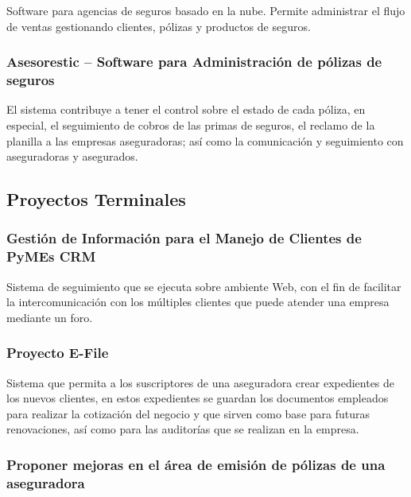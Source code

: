 Software para agencias de seguros basado en la nube. Permite administrar el flujo de ventas gestionando clientes, pólizas y productos de seguros. 

\subsubsection*{Asesorestic – Software para Administración de pólizas de seguros \cite{www:asesorestic}}

El sistema contribuye a tener el control sobre el estado de cada póliza, en especial, el seguimiento de cobros de las primas de seguros, el reclamo de la planilla a las empresas aseguradoras; as\'i como la comunicación y seguimiento con aseguradoras y asegurados.

\subsection*{Proyectos Terminales}

\subsubsection*{Gestión de Información para el Manejo de Clientes de PyMEs CRM \cite{pro:crm}}

Sistema  de  seguimiento  que  se  
ejecuta sobre ambiente Web, con el fin de facilitar la intercomunicación con los múltiples clientes 
que puede atender una empresa mediante un foro.

\subsubsection*{Proyecto E-File \cite{pro:zurich}}

Sistema  que  permita  a  los  suscriptores  de  una 
aseguradora  crear expedientes de los nuevos clientes, en 
estos   expedientes   se   guardan   los   documentos   empleados   para   realizar  la  cotización  del  negocio  y  que  sirven  como  base  para  
futuras renovaciones, así como para las auditorías que se realizan en la empresa. 

\subsubsection*{Proponer mejoras en el área de emisión de pólizas de una aseguradora \cite{pro:emi}}

